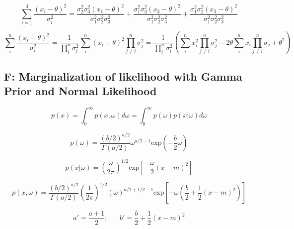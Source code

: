 \documentclass[12pt]{article}
\begin{document}
            \begin{equation}
                  \sum_{i=1}^3\frac{(x_i - \theta)^2}{\sigma_i^2} = \frac{\sigma_2^2 \sigma_3^2 (x_1 - \theta)^2}{\sigma_1^2 \sigma_2^2 \sigma_3^2} + \frac{\sigma_1^2 \sigma_3^2 (x_2 - \theta)^2}{\sigma_1^2 \sigma_2^2 \sigma_3^2} + \frac{\sigma_1^2 \sigma_2^2 (x_3 - \theta)^2}{\sigma_1^2 \sigma_2^2 \sigma_3^2}
            \end{equation}

            \begin{equation}
                  \sum_i^n \frac{(x_i - \theta)^2}{\sigma_i^2} = \frac{1}{\prod_i^n \sigma_i^2} \sum_i^n (x_i - \theta)^2 \prod_{j\neq i}^n \sigma_j^2 = \frac{1}{\prod_i^n \sigma_i^2} \left ( \sum_i^n x_i^2 \prod_{j \neq i}^n \sigma_j^2 - 2 \theta \sum_i^n x_i \prod_{j \neq i}^n \sigma_j + \theta^2 \right)
            \end{equation}

      \subsection*{F: Marginalization of likelihood with Gamma Prior and Normal Likelihood}

            \begin{equation}
                  p(x) = \int_0^{\infty} p(x,\omega)d\omega = \int_0^{\infty} p(\omega)p(x|\omega)d\omega
            \end{equation}

            \begin{equation}
                  p(\omega) = \frac{(b/2)^{a/2}}{\Gamma(a/2)}{\omega}^{a/2-1} \text{exp}\left (-\frac{b}{2}\omega \right)
            \end{equation}

            \begin{equation}
                  p(x|\omega) = \left( \frac{\omega}{2 \pi}\right)^{1/2} \text{exp} \left [ -\frac{\omega}{2}(x - m)^2\right]
            \end{equation}

            \begin{equation}
                  p(x,\omega) = \frac{(b/2)^{a/2}}{\Gamma(a/2)}  \left( \frac{1}{2 \pi}\right)^{1/2} (\omega)^{a/2+1/2-1}\text{exp}\left[-\omega \left( \frac{b}{2} + \frac{1}{2}(x - m)^2\right) \right]
            \end{equation}

            \begin{equation}
                  a' = \frac{a+1}{2}; \hspace{20pt} b'= \frac{b}{2} + \frac{1}{2}(x-m)^2
            \end{equation}
\end{document}
